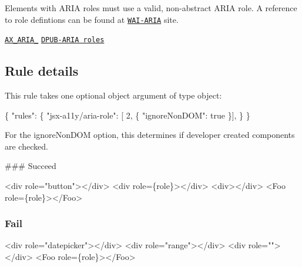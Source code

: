 Elements with A\+R\+IA roles must use a valid, non-\/abstract A\+R\+IA role. A reference to role defintions can be found at \href{https://www.w3.org/TR/wai-aria/roles#role_definitions}{\tt W\+A\+I-\/\+A\+R\+IA} site.

\href{https://github.com/GoogleChrome/accessibility-developer-tools/wiki/Audit-Rules#ax_aria_01}{\tt A\+X\+\_\+\+A\+R\+I\+A\+\_} \href{https://www.w3.org/TR/dpub-aria-1.0/}{\tt D\+P\+U\+B-\/\+A\+R\+IA roles}

\subsection*{Rule details}

This rule takes one optional object argument of type object\+:


\begin{DoxyCode}
\{
    "rules": \{
        "jsx-a11y/aria-role": [ 2, \{
            "ignoreNonDOM": true
        \}],
    \}
\}
\end{DoxyCode}


For the {\ttfamily ignore\+Non\+D\+OM} option, this determines if developer created components are checked.

\#\#\# Succeed 
\begin{DoxyCode}
<div role="button"></div>     
<div role=\{role\}></div>       
<div></div>                   
<Foo role=\{role\}></Foo>       
\end{DoxyCode}


\subsubsection*{Fail}


\begin{DoxyCode}
<div role="datepicker"></div> 
<div role="range"></div>      
<div role=""></div>           
<Foo role=\{role\}></Foo>       
\end{DoxyCode}
 